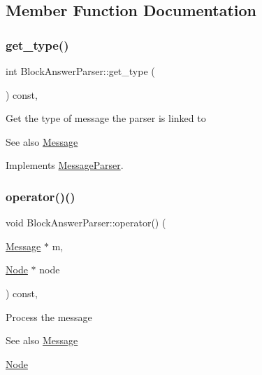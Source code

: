 \subsection{Member Function Documentation}
\mbox{\label{classBlockAnswerParser_af29553ca77e4879f40f60a871105b6d4}} 
\subsubsection{\texorpdfstring{get\+\_\+type()}{get\_type()}}
{\footnotesize\ttfamily int Block\+Answer\+Parser\+::get\+\_\+type (\begin{DoxyParamCaption}{ }\end{DoxyParamCaption}) const\hspace{0.3cm}{\ttfamily [final]}, {\ttfamily [virtual]}}

Get the type of message the parser is linked to \begin{DoxySeeAlso}{See also}
\mbox{\hyperlink{classMessage}{Message}} 
\end{DoxySeeAlso}


Implements \mbox{\hyperlink{classMessageParser_aa7c495d7b28a394e5752ca25ffff69d8}{Message\+Parser}}.

\mbox{\label{classBlockAnswerParser_a984cd68ad8878777f86cf6ed0892dd1d}} 
\subsubsection{\texorpdfstring{operator()()}{operator()()}}
{\footnotesize\ttfamily void Block\+Answer\+Parser\+::operator() (\begin{DoxyParamCaption}\item[{\mbox{\hyperlink{classMessage}{Message}} $\ast$}]{m,  }\item[{\mbox{\hyperlink{classNode}{Node}} $\ast$}]{node }\end{DoxyParamCaption}) const\hspace{0.3cm}{\ttfamily [final]}, {\ttfamily [virtual]}}

Process the message \begin{DoxySeeAlso}{See also}
\mbox{\hyperlink{classMessage}{Message}} 

\mbox{\hyperlink{classNode}{Node}}
\end{DoxySeeAlso}

